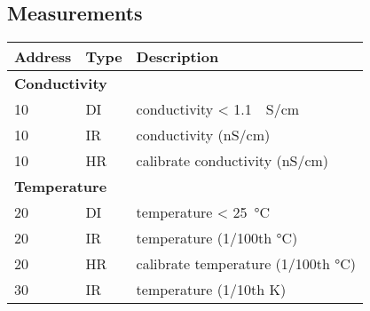 \documentclass[twocolumn,11pt,a4paper]{extarticle}
\begin{document}
\subsection{Measurements}
\begin{tabularx}{\columnwidth}{l l X}
	\toprule
	\textbf{Address} & \textbf{Type} & \textbf{Description}\\
	\midrule
	\multicolumn{3}{l}{\textbf{Conductivity}}\\
	\midrule
	10 & DI & conductivity < \SI{1.1}{\micro{}S/cm}\\
	10 & IR & conductivity (nS/cm)\\
	10 & HR & calibrate conductivity  (nS/cm)\\
	\midrule
	\multicolumn{3}{l}{\textbf{Temperature}}\\
	\midrule
	20 & DI & temperature < \SI{25}{\degreeCelsius}\\
	20 & IR & temperature (1/100th °C)\\
	20 & HR & calibrate temperature (1/100th °C)\\
	30 & IR & temperature (1/10th K)\\
	\bottomrule
\end{tabularx}
\end{document}
